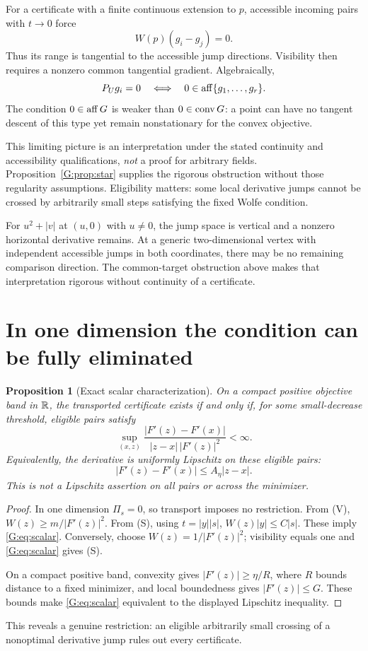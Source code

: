 \documentclass[10pt,oneside,openany]{book}
\newtheorem{proposition}{Proposition}[chapter]
\theoremstyle{remark}\newtheorem{remark}{Remark}[chapter]
\begin{document}
For a certificate with a finite continuous extension to $p$, accessible incoming pairs with $t\to0$ force
\[
 W(p)(g_i-g_j)=0.
\]
Thus its range is tangential to the accessible jump directions. Visibility then requires a nonzero common tangential gradient. Algebraically,
\[
 P_Ug_i=0\quad\Longleftrightarrow\quad0\in\operatorname{aff}\{g_1,\dots,g_r\}.
\]
The condition $0\in\operatorname{aff} G$ is weaker than $0\in\operatorname{conv} G$: a point can have no tangent descent of this type yet remain nonstationary for the convex objective.

This limiting picture is an interpretation under the stated continuity and accessibility qualifications, \emph{not} a proof for arbitrary fields. Proposition~\ref{G:prop:star} supplies the rigorous obstruction without those regularity assumptions. Eligibility matters: some local derivative jumps cannot be crossed by arbitrarily small steps satisfying the fixed Wolfe condition.

For $u^2+|v|$ at $(u,0)$ with $u\ne0$, the jump space is vertical and a nonzero horizontal derivative remains. At a generic two-dimensional vertex with independent accessible jumps in both coordinates, there may be no remaining comparison direction. The common-target obstruction above makes that interpretation rigorous without continuity of a certificate.


\setcounter{section}{5}
\setcounter{theorem}{0}
\setcounter{equation}{5}
\section{In one dimension the condition can be fully eliminated}
\begin{proposition}[Exact scalar characterization]
On a compact positive objective band in $\mathbb R$, the transported certificate exists if and only if, for some small-decrease threshold, eligible pairs satisfy
\begin{equation}
 \sup_{(x,z)}\frac{|F'(z)-F'(x)|}{|z-x|\,|F'(z)|^2}<\infty. \label{G:eq:scalar}
\end{equation}
Equivalently, the derivative is uniformly Lipschitz on these eligible pairs:
\[
 |F'(z)-F'(x)|\le A_\eta|z-x|.
\]
This is not a Lipschitz assertion on all pairs or across the minimizer.
\end{proposition}
\begin{proof}
In one dimension $\Pi_s=0$, so transport imposes no restriction. From (V),
$W(z)\ge m/|F'(z)|^2$. From (S), using $t=|y||s|$,
$W(z)|y|\le C|s|$. These imply \eqref{G:eq:scalar}. Conversely, choose
$W(z)=1/|F'(z)|^2$; visibility equals one and \eqref{G:eq:scalar} gives (S).

On a compact positive band, convexity gives $|F'(z)|\ge\eta/R$, where $R$ bounds distance to a fixed minimizer, and local boundedness gives $|F'(z)|\le G$. These bounds make \eqref{G:eq:scalar} equivalent to the displayed Lipschitz inequality.
\end{proof}
This reveals a genuine restriction: an eligible arbitrarily small crossing of a nonoptimal derivative jump rules out every certificate.
\end{document}
